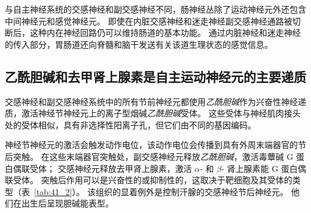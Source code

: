 与自主神经系统的交感神经和副交感神经不同，肠神经丛除了运动神经元外还包含中间神经元和感觉神经元。
即使在内脏交感神经和迷走神经副交感神经通路被切断后，这种内在神经回路仍可以维持肠道的基本功能。
通过内脏神经和迷走神经的传入部分，胃肠道还向脊髓和脑干发送有关该道生理状态的感觉信息。



\subsection{乙酰胆碱和去甲肾上腺素是自主运动神经元的主要递质}

交感神经和副交感神经系统中的所有节前神经元都使用\textit{乙酰胆碱}作为兴奋性神经递质，激活神经节神经元上的离子型烟碱\textit{乙酰胆碱}受体。
这些受体与神经肌肉接头处的受体相似，具有非选择性阳离子孔，但它们由不同的基因编码。


神经节神经元的激活会触发动作电位，该动作电位会传播到具有外周末端器官的节后突触。
在这些末端器官突触处，副交感神经元释放\textit{乙酰胆碱}，激活毒蕈碱 G 蛋白偶联受体；
交感神经元释放去甲肾上腺素，激活 $\alpha$- 和 $\beta$- 肾上腺素能 G 蛋白偶联受体。
突触后作用可以是兴奋性的或抑制性的，这取决于靶细胞及其受体的类型（表~\ref{tab:41_2}）。
该组织的显着例外是控制汗腺的交感神经节后神经元。
他们在出生后呈现胆碱能表型。


